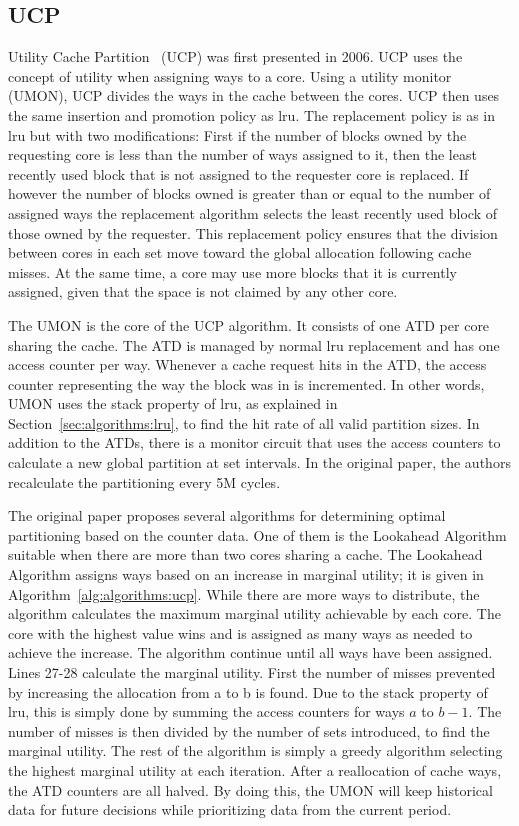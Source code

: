 \subsection{UCP}
\label{sec:algorithms:ucp}

Utility Cache Partition~\cite{Qureshi2006} (UCP) was first presented in 2006. 
UCP uses the concept of utility when assigning ways to a core.
Using a utility monitor (UMON), UCP divides the ways in the cache between the cores.
UCP then uses the same insertion and promotion policy as \gls{lru}.
The replacement policy is as in \gls{lru} but with two modifications:
First if the number of blocks owned by the requesting core is less than the number of ways assigned to it, then the least recently used block that is not assigned to the requester core is replaced.
If however the number of blocks owned is greater than or equal to the number of assigned ways the replacement algorithm selects the least recently used block of those owned by the requester.
This replacement policy ensures that the division between cores in each set move toward the global allocation following cache misses.
At the same time, a core may use more blocks that it is currently assigned, given that the space is not claimed by any other core.

The UMON is the core of the UCP algorithm.
It consists of one ATD per core sharing the cache. 
The ATD is managed by normal \gls{lru} replacement and has one access counter per way.
Whenever a cache request hits in the ATD, the access counter representing the way the block was in is incremented.
In other words, UMON uses the stack property of \gls{lru}, as explained in Section~\ref{sec:algorithms:lru}, to find the hit rate of all valid partition sizes.
In addition to the ATDs, there is a monitor circuit that uses the access counters to calculate a new global partition at set intervals.
In the original paper, the authors recalculate the partitioning every 5M cycles.

The original paper proposes several algorithms for determining optimal partitioning based on the counter data. 
One of them is the Lookahead Algorithm suitable when there are more than two cores sharing a cache.
The Lookahead Algorithm assigns ways based on an increase in marginal utility; it is given in Algorithm~\ref{alg:algorithms:ucp}.
While there are more ways to distribute, the algorithm calculates the maximum marginal utility achievable by each core. 
The core with the highest value wins and is assigned as many ways as needed to achieve the increase.
The algorithm continue until all ways have been assigned.
Lines 27-28 calculate the marginal utility. 
First the number of misses prevented by increasing the allocation from a to b is found.
Due to the stack property of \gls{lru}, this is simply done by summing the access counters for ways $a$ to $b-1$.
The number of misses is then divided by the number of sets introduced, to find the marginal utility.
The rest of the algorithm is simply a greedy algorithm selecting the highest marginal utility at each iteration.
After a reallocation of cache ways, the ATD counters are all halved.
By doing this, the UMON will keep historical data for future decisions while prioritizing data from the current period.

